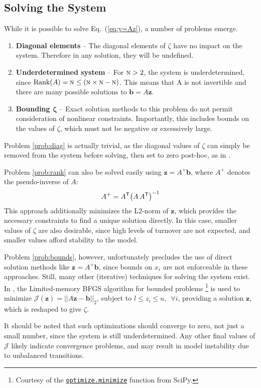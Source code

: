 \documentclass{article}
\newcommand{\N}{\textsc{n}}
\begin{document}
\subsection{Solving the System}
While it is possible to solve Eq.~(\ref{eq:y=Az}), a number of problems emerge.
\begin{enumerate}
  \item \textbf{Diagonal elements}\label{prob:diag} --
  The diagonal elements of $\zeta$ have no impact on the system.
  Therefore in any solution, they will be undefined.
  \item \textbf{Underdetermined system}\label{prob:rank} --
  For $\N > 2$, the system is underdetermined,
  since $\mathrm{Rank}(A) = \N \le (\N\times\N - \N)$.
  This means that A is not invertible and
  there are many possible solutions to $\bm{b} = A\bm{z}$.
  \item \textbf{Bounding $\bm{\zeta}$}\label{prob:bounds} --
  Exact solution methods to this problem do not permit consideration of nonlinear constraints.
  Importantly, this includes bounds on the values of $\zeta$,
  which must not be negative or excessively large.
\end{enumerate}
Problem \ref{prob:diag} is actually trivial,
as the diagonal values of $\zeta$ can simply be
removed from the system before solving, then set to zero post-hoc,
as in .
\par
Problem \ref{prob:rank} can also be solved easily using $\bm{z} = A^{+}\bm{b}$,
where $A^{+}$ denotes the pseudo-inverse of $A$:
\begin{equation}
A^{+} = A^{\mathsf{T}}{\left(A \thinspace A^{\mathsf{T}}\right)}^{-1}
\end{equation}
This approach additionally minimizes the L2-norm of $\bm{z}$,
which provides the necessary constraints to find a unique solution directly.
In this case, smaller values of $\zeta$ are also desirable,
since high levels of turnover are not expected,
and smaller values afford stability to the model.
\par
Problem \ref{prob:bounds}, however, unfortunately precludes the use of
direct solution methods like $\bm{z} = A^{+}\bm{b}$,
since bounds on $x_i$ are not enforceable in these approaches.
Still, many other (iterative) techniques for solving the system exist.
In , the Limited-memory BFGS algorithm for bounded problems%
\footnote{Courtesy of the
  \href{https://docs.scipy.org/doc/scipy-1.0.0/reference/generated/scipy.optimize.minimize.html}%
       {\texttt{optimize.minimize}}
  function from SciPy.}
is used to minimize $\mathcal{J}(\bm{z}) = {\left|\left| A\bm{z} - \bm{b} \right|\right|}_2$,
subject to $l \le z_i \le u, \enspace\forall i$,
providing a solution $\bm{z}$, which is reshaped to give $\zeta$.
\par
It should be noted that such optimizations should converge to zero, not just a small number,
since the system is still underdetermined.
Any other final values of $\mathcal{J}$ likely indicate convergence problems,
and may result in model instability due to unbalanced transitions.
\end{document}
